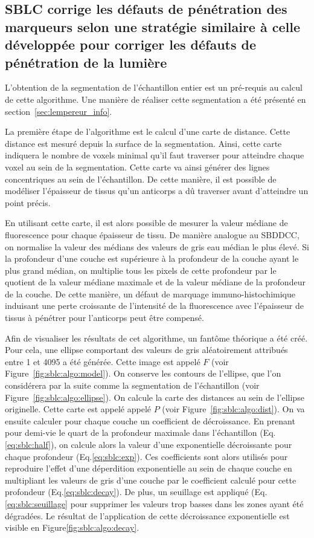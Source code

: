 \documentclass[\main/main.tex]{subfiles}
\begin{document}
    \subsection{SBLC corrige les défauts de pénétration des marqueurs selon une stratégie similaire à celle développée pour corriger les défauts de pénétration de la lumière}
 
%
L'obtention de la segmentation de l'échantillon entier est un pré-requis au calcul de cette algorithme.
%
Une manière de réaliser cette segmentation a été présenté en section~\ref{sec:lempereur_info}.

%
La première étape de l'algorithme est le calcul
d'une carte de distance.
%
Cette distance est mesuré depuis la surface de la segmentation.
%
Ainsi, cette carte indiquera le nombre de voxels minimal qu'il faut
traverser pour atteindre chaque voxel au sein de la segmentation.
%
Cette carte va ainsi générer des lignes concentriques au sein de l'échantillon.
%
De cette manière, il est possible de modéliser l'épaisseur de tissus qu'un anticorps a dû traverser avant d'atteindre un point précis.
%

%
En utilisant cette carte, il est alors possible de mesurer la valeur médiane de fluorescence pour chaque épaisseur de tissu.
%
De manière analogue au SBDDCC, on normalise la valeur des médians des valeurs de gris eau médian le plus élevé. Si la profondeur d'une couche est supérieure à la profondeur de la couche ayant le plus grand médian, on multiplie tous les pixels de cette profondeur par le quotient de la valeur médiane maximale et de la valeur médiane de la profondeur de la couche.
%
De cette manière, un défaut de marquage immuno-histochimique 
induisant une perte croissante de l'intensité de la fluorescence avec
l'épaisseur de tissus à pénétrer pour l'anticorps peut être
compensé.

%
Afin de visualiser les résultats de cet algorithme, un fantôme théorique a été créé.
%
Pour cela, une ellipse comportant des valeurs de gris 
aléatoirement attribués entre 1 et 4095 a été générée.
%
Cette image est appelé $F$ (voir Figure~\ref{fig:sblc:algo:model}).
%
On conserve les contours de l'ellipse, que l'on considérera par la suite comme la segmentation de l'échantillon (voir Figure~\ref{fig:sblc:algo:ellipse}).
%
On calcule la carte des distances au sein de l'ellipse originelle.
%
Cette carte est appelé appelé $P$ (voir Figure~\ref{fig:sblc:algo:dist}).
%
On va ensuite calculer pour chaque couche un coefficient de décroissance.
%
En prenant pour demi-vie le quart de la profondeur maximale dans l'échantillon (Eq.\eqref{eq:sblc:half}), on calcule alors la valeur d'une exponentielle décroissante pour chaque profondeur (Eq.\eqref{eq:sblc:exp}).
%
Ces coefficients sont alors utilisés pour reproduire l'effet d'une déperdition exponentielle au sein de chaque couche en multipliant les valeurs de gris d'une couche par le coefficient calculé pour cette profondeur (Eq.\eqref{eq:sblc:decay}).
%
De plus, un seuillage est appliqué (Eq.\eqref{eq:sblc:seuillage} pour supprimer les valeurs trop basses dans les zones ayant été dégradées.
%
Le résultat de l'application de cette décroissance exponentielle est visible en Figure\ref{fig:sblc:algo:decay}.
\end{document}
